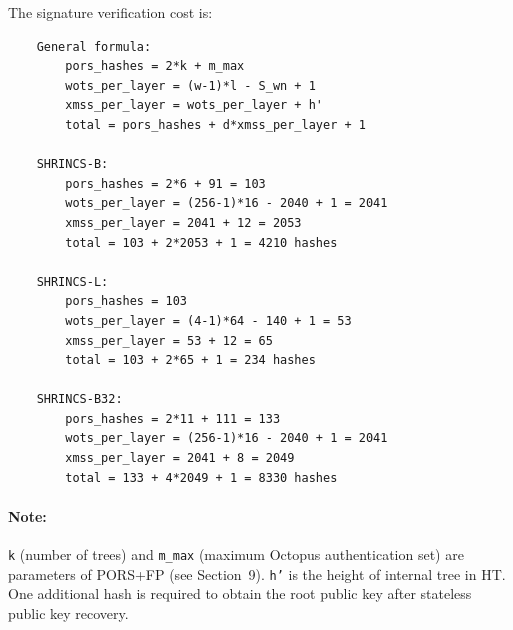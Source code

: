 The signature verification cost is:
\begin{verbatim}
    General formula:
        pors_hashes = 2*k + m_max
        wots_per_layer = (w-1)*l - S_wn + 1
        xmss_per_layer = wots_per_layer + h'
        total = pors_hashes + d*xmss_per_layer + 1

    SHRINCS-B:
        pors_hashes = 2*6 + 91 = 103
        wots_per_layer = (256-1)*16 - 2040 + 1 = 2041
        xmss_per_layer = 2041 + 12 = 2053
        total = 103 + 2*2053 + 1 = 4210 hashes

    SHRINCS-L:
        pors_hashes = 103
        wots_per_layer = (4-1)*64 - 140 + 1 = 53
        xmss_per_layer = 53 + 12 = 65
        total = 103 + 2*65 + 1 = 234 hashes

    SHRINCS-B32:
        pors_hashes = 2*11 + 111 = 133
        wots_per_layer = (256-1)*16 - 2040 + 1 = 2041
        xmss_per_layer = 2041 + 8 = 2049
        total = 133 + 4*2049 + 1 = 8330 hashes
\end{verbatim}

\paragraph{Note:} \texttt{k} (number of trees) and \texttt{m\_max} (maximum Octopus authentication set) are parameters of PORS+FP (see Section~9). \texttt{h'} is the height of internal tree in HT. One additional hash is required to obtain the root public key after stateless public key recovery. 